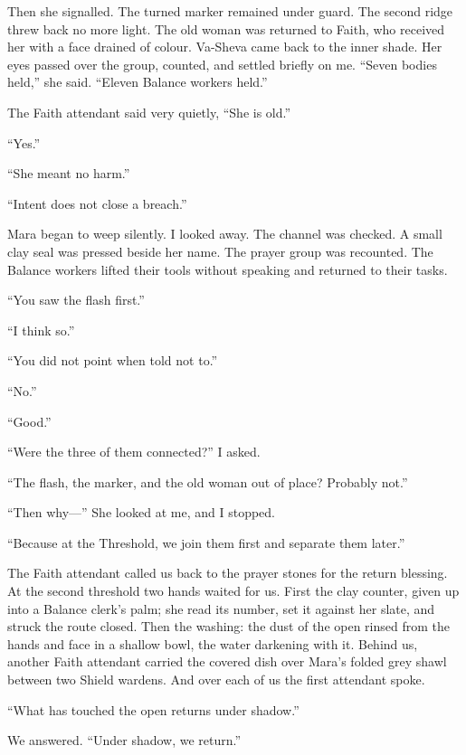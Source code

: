 Then she signalled. The turned marker remained under guard. The second ridge threw back no more light. The old woman was returned to Faith, who received her with a face drained of colour. Va-Sheva came back to the inner shade. Her eyes passed over the group, counted, and settled briefly on me. ``Seven bodies held,'' she said. ``Eleven Balance workers held.''\par

The Faith attendant said very quietly, ``She is old.''\par
``Yes.''\par
``She meant no harm.''\par
``Intent does not close a breach.''\par

Mara began to weep silently. I looked away. The channel was checked. A small clay seal was pressed beside her name. The prayer group was recounted. The Balance workers lifted their tools without speaking and returned to their tasks.\par

``You saw the flash first.''\par
``I think so.''\par
``You did not point when told not to.''\par
``No.''\par
``Good.''\par
``Were the three of them connected?'' I asked.\par
``The flash, the marker, and the old woman out of place? Probably not.''\par
``Then why---'' She looked at me, and I stopped. \par
``Because at the Threshold, we join them first and separate them later.''

\ornament

The Faith attendant called us back to the prayer stones for the return blessing. At the second threshold two hands waited for us. First the clay counter, given up into a Balance clerk's palm; she read its number, set it against her slate, and struck the route closed. Then the washing: the dust of the open rinsed from the hands and face in a shallow bowl, the water darkening with it. Behind us, another Faith attendant carried the covered dish over Mara's folded grey shawl between two Shield wardens. And over each of us the first attendant spoke.\par

``What has touched the open returns under shadow.''\par
We answered. ``Under shadow, we return.''\par


